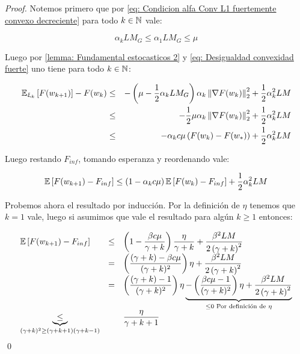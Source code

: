 \begin{proof}
	Notemos primero que por \ref{eq: Condicion alfa Conv L1 fuertemente convexo decreciente} para todo $k \in {\mathbb{N}}$ vale:
	
	\begin{equation*}
		\alpha_k L M_G \leq \alpha_1 L M_G \leq \mu
	\end{equation*}
	
	Luego por \ref{lemma: Fundamental estocasticos 2} y \ref{eq: Desigualdad convexidad fuerte} uno tiene para todo $k \in {\mathbb{N}}$:
	
	\begin{equation*}
	\begin{aligned}
		\mathbb{E}_{\upxi_{k}} \left[F(w_{k+1})\right] - F(w_k) & \leq & - \left( \mu - \frac{1}{2} \alpha_k L M_G \right)\alpha_k \left\lVert\nabla F(w_k)\right\rVert_2^2 + \frac{1}{2} \alpha_k^2 L M \\
		& \leq & - \frac{1}{2} \mu\alpha_k \left\lVert\nabla F(w_k)\right\rVert_2^2 + \frac{1}{2} \alpha_k^2 L M \\
		& \leq & - \alpha_k c \mu \left(F(w_k) - F(w_*)\right) + \frac{1}{2} \alpha_k^2 L M
	\end{aligned}
	\end{equation*}
	
	Luego restando $F_{inf}$, tomando esperanza y reordenando vale:
	
	\begin{equation*}
		\mathbb{E} \left[F(w_{k+1}) - F_{inf}\right] \leq \left(1 - \alpha_k c \mu \right) \mathbb{E} \left[F(w_{k}) - F_{inf}\right]  + \frac{1}{2} \alpha_k^2 L M
	\end{equation*}
	
	Probemos ahora el resultado por inducci\'on. Por la definici\'on de $\eta$ tenemos que $k = 1$ vale, luego si asumimos que vale el resultado para alg\'un $k \geq 1$ entonces:
	
	
	\begin{equation*}
	\begin{array}{lll}
		\mathbb{E} \left[F(w_{k+1}) - F_{inf}\right] & \leq & \left(1 - \dfrac{\beta c \mu }{\gamma + k}\right) \dfrac{\eta}{\gamma + k} + \dfrac{\beta^2 LM}{2 \left(\gamma + k\right)^2} \\
		& = & \left(\dfrac{(\gamma + k) - \beta c \mu }{(\gamma + k)^2}\right) {\eta}+ \dfrac{\beta^2 LM}{2 \left(\gamma + k\right)^2} \\
		& = & \left(\dfrac{(\gamma + k) - 1}{(\gamma + k)^2}\right) {\eta}  \underbrace{- \left(\dfrac{\beta c \mu -1}{(\gamma + k)^2}\right)\eta +  \dfrac{\beta^2 LM}{2 \left(\gamma + k\right)^2}}_{\leq 0 \text{ Por definici\'on de } \eta}\\
		\underbrace{\leq}_{(\gamma + k)^2 \geq (\gamma + k + 1)(\gamma + k - 1)} & & \dfrac{\eta}{\gamma + k + 1}
	\end{array}
	\end{equation*}\qed

\end{proof}

